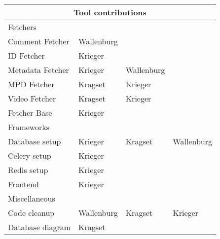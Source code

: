 \begin{appendix}
    \resizebox{8cm}{!} {
        \begin{tabular}{| l | l | l | l |}
            \hline
            \multicolumn{4}{|c|}{Tool contributions} \\
            \hline
            \multicolumn{4}{|l|}{Fetchers} \\
            \hline
            Comment Fetcher & Wallenburg & & \\
            ID Fetcher & Krieger & & \\
            Metadata Fetcher & Krieger & Wallenburg & \\
            MPD Fetcher & Kragset & Krieger & \\
            Video Fetcher & Kragset & Krieger & \\
            Fetcher Base & Krieger & & \\
            \hline
            \multicolumn{4}{|l|}{Frameworks} \\
            \hline
            Database setup & Krieger & Kragset & Wallenburg \\
            Celery setup & Krieger & & \\
            Redis setup & Krieger & & \\
            Frontend & Krieger & & \\
            \hline
            \multicolumn{4}{|l|}{Miscellaneous} \\
            \hline
            Code cleanup & Wallenburg & Kragset & Krieger \\
            Database diagram & Kragset & & \\
            \hline
        \end{tabular}
    }

\end{appendix}
